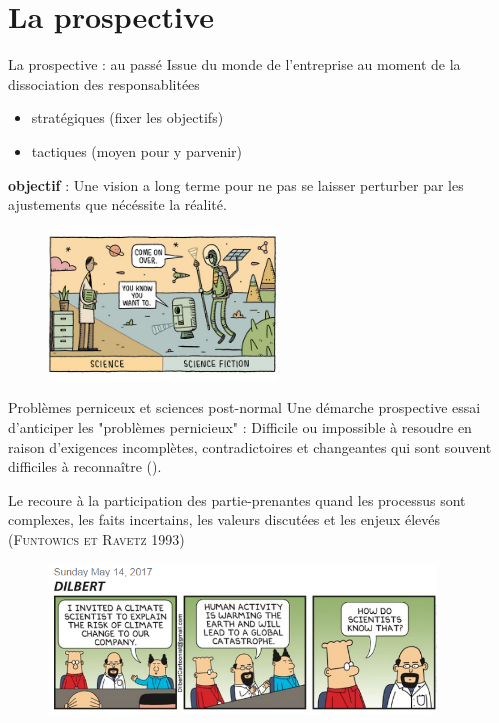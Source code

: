 \documentclass[newPxFont]{beamer}
\begin{document}
%
%
\section{La prospective}

\begin{frame}[c]{La prospective : au passé}
\vspace{-2em}
Issue du monde de l'entreprise au moment de la dissociation des responsablitées
\begin{itemize}
  \item stratégiques (fixer les objectifs)
  \item tactiques (moyen pour y parvenir)
\end{itemize}
\textbf{objectif} : Une vision a long terme pour ne pas se laisser perturber par les ajustements que nécéssite la réalité.
\begin{figure}
 \includegraphics[height=4cm]{img/a_gauld_tom_new_scientist.jpg}
\end{figure}
\end{frame}

\begin{frame}[c]{Problèmes perniceux et sciences post-normal}
\vspace{-2em}
Une démarche prospective essai d'anticiper les "problèmes pernicieux" :  Difficile ou impossible à resoudre en raison d'exigences incomplètes, contradictoires et changeantes qui sont souvent difficiles à reconnaître ().

Le recoure à la participation des partie-prenantes quand les processus sont complexes, les faits incertains, les valeurs discutées et les enjeux élevés (\textsc{Funtowics et Ravetz 1993})

\begin{figure}
 \includegraphics[height=4cm]{img/a_dilbert-climate-science.png}
\end{figure}
\end{frame}
\end{document}
